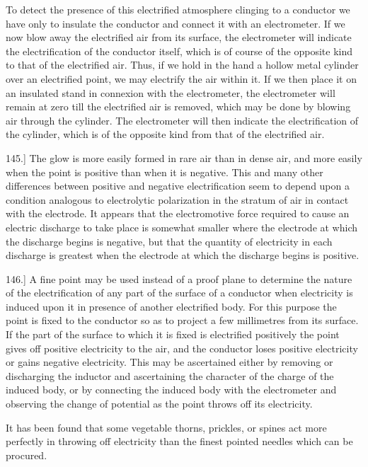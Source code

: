 \documentclass[12pt,oneside]{book}[2021/10/04]
\newcommand{\Runhead}[1]{\fancyhead[C]{\iffloatpage{}{\small#1}}}
\newcommand{\article}[1]{\phantomsection \label{art:#1}{#1.]}}
\newcommand{\¬}{\hphantom{0}}
\begin{document}
To detect the presence of this electrified atmosphere clinging
to a conductor we have only to insulate the conductor and connect
it with an electrometer. If we now blow away the electrified air
from its surface, the electrometer will indicate the electrification
of the conductor itself, which is of course of the opposite kind
to that of the electrified air. Thus, if we hold in the hand a
hollow metal cylinder over an electrified point, we may electrify
the air within it. If we then place it on an insulated stand in
connexion with the electrometer, the electrometer will remain at
zero till the electrified air is removed, which may be done by
blowing air through the cylinder. The electrometer will then
indicate the electrification of the cylinder, which is of the opposite
kind from that of the electrified air.

\article{145} The glow is more easily formed in rare air than in dense
air, and more easily when the point is positive than when it is
negative. This and many other differences between positive and
negative electrification seem to depend upon a condition analogous
to electrolytic polarization in the stratum of air in contact with
the electrode. It appears that the electromotive force required
to cause an electric discharge to take place is somewhat smaller
where the electrode at which the discharge begins is negative, but
that the quantity of electricity in each discharge is greatest when
the electrode at which the discharge begins is positive.

\article{146} A fine point may be used instead of a proof plane to determine
the nature of the electrification of any part of the surface of
a conductor when electricity is induced upon it in presence of
another electrified body. For this purpose the point is fixed to the
conductor so as to project a few millimetres from its surface. If
the part of the surface to which it is fixed is electrified positively
the point gives off positive electricity to the air, and the conductor
loses positive electricity or gains negative electricity. This may
be ascertained either by removing or discharging the inductor and
ascertaining the character of the charge of the induced body, or by
connecting the induced body with the electrometer and observing
the change of potential as the point throws off its electricity.
\Runhead{ACTION OF POINTS.}

It has been found that some vegetable thorns, prickles, or spines
act more perfectly in throwing off electricity than the finest pointed
needles which can be procured.
\end{document}
